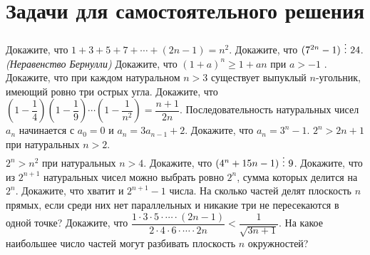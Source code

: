 \documentclass[a4paper,12pt]{article}
\begin{document}
    \newrules
    
    \section{Задачи для самостоятельного решения}
    \problem Докажите, что $1 + 3 + 5 + 7 + \cdots + (2n - 1) = n^2$.
    \problem Докажите, что $(7^{2n} - 1) \ \vdots\  24$.
    \problem \textit{(Неравенство Бернулли)} Докажите, что $(1 + a)^n \geq 1 + an$ при $a > -1$ .
    \problem Докажите, что при каждом натуральном $n > 3$ существует выпуклый $n$-угольник, имеющий
ровно три острых угла.
    \problem Докажите, что $\left(1 - \dfrac{1}{4}\right)\left(1 - \dfrac{1}{9}\right) \cdots \left(1 - \dfrac{1}{n^2}\right) = \dfrac{n+1}{2n}$.
    \problem Последовательность натуральных чисел $a_n$ начинается с $a_0 = 0$ и $a_n = 3a_{n-1} + 2$.
Докажите, что $a_n = 3^n - 1$.
    \problem \sub $2^n > 2n + 1$ при натуральных $n > 2$. \\
    \sub $2^n > n^2$ при натуральных $n > 4$.
    \problem Докажите, что $(4^n + 15n - 1) \ \vdots\  9$.
    \problem \sub Докажите, что из $2^{n+1}$ натуральных чисел можно выбрать ровно $2^n$, сумма которых делится на $2^n$. \sub Докажите, что хватит и $2^{n+1} - 1$ числа.
    \problem На сколько частей делят плоскость $n$ прямых, если среди них нет параллельных и никакие три не пересекаются в одной точке?
    \problem Докажите, что $\dfrac{1 \cdot 3 \cdot 5 \cdot \cdots \cdot (2n - 1)}{2 \cdot 4 \cdot 6 \cdot \cdots \cdot 2n} < \dfrac{1}{\sqrt{3n + 1}}$.
    \problem На какое наибольшее число частей могут разбивать плоскость $n$ окружностей?
    
\end{document}

